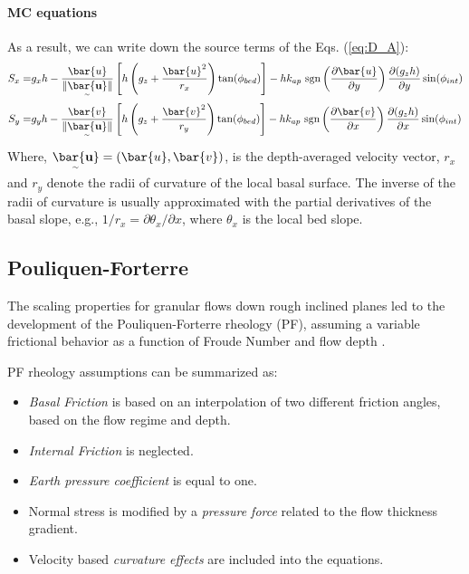 \documentclass[nhess, manuscript]{copernicus}
\begin{document}
\paragraph{MC equations} As a result, we can write down the source terms of the Eqs. (\ref{eq:D_A}):
\begin{eqnarray}\label{S_terms_MC}
S_x =& g_x h  - \frac{\bar{u}}{\| \underset{^\sim}{\bar{\textbf u}} \|} \left[h\left(g_z+\frac{\bar{u}^2}{r_x}\right)\tan(\phi_{bed})\right] - h k_{ap} \ {\rm sgn}\left(\frac{\partial \bar{u}}{\partial y}\right) \frac{\partial (g_z h)}{\partial y} \sin(\phi_{int}) \nonumber \\
 S_y =& g_y h  - \frac{\bar{v}}{\| \underset{^\sim}{\bar{\textbf u}} \|} \left[h\left(g_z +\frac{\bar{v}^2}{r_y}\right)\tan(\phi_{bed})\right] - h k_{ap} \ {\rm sgn}\left({\frac{\partial \bar{v}}{\partial x}}\right) \frac{\partial (g_z h)}{\partial x} \sin(\phi_{int})
\end{eqnarray}
Where, $\underset{^\sim}{\bar{\textbf u}} = (\bar{u} , \bar{v})$, is the depth-averaged velocity vector, $r_x$ and $r_y$ denote the radii of curvature
of the local basal surface. The inverse of the radii of curvature is usually approximated with the partial derivatives of the basal slope, e.g., $1/r_x = \partial \theta_x/\partial x$, where $\theta_x$ is the local bed slope.

\subsection{Pouliquen-Forterre}\label{PFM}
The scaling properties for granular flows down rough inclined planes led to the development of the Pouliquen-Forterre rheology (PF), assuming a variable frictional behavior as a function of Froude Number and flow depth \citep{Pouliquen1999, ForterrePouliquen2002, PouliquenForterre2002, ForterrePouliquen2003}.

PF rheology assumptions can be summarized as:
\begin{itemize}
\item \textit{Basal Friction} is based on an interpolation of two different friction angles, based on the flow regime and depth.

\item \textit{Internal Friction} is neglected.

\item \textit{Earth pressure coefficient} is equal to one.

\item Normal stress is modified by a \textit{pressure force} related to the flow thickness gradient.

\item Velocity based \textit{curvature effects} are included into the equations.
\end{itemize}
\end{document}
